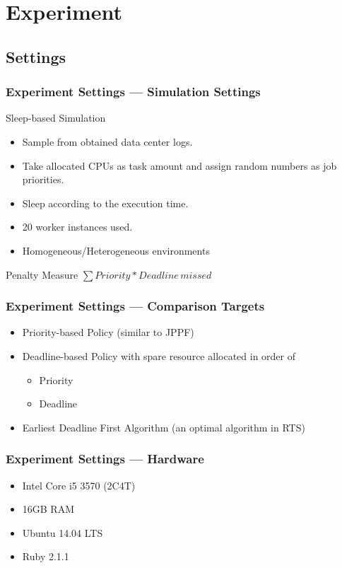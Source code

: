 \section{Experiment}
\subsection{Settings}
\begin{frame}
  \frametitle{Experiment Settings --- Simulation Settings}
  Sleep-based Simulation
  \begin{itemize}
    \item Sample from obtained data center logs.
    \item Take allocated CPUs as task amount and assign random numbers
      as job priorities.
    \item Sleep according to the execution time.
    \item 20 worker instances used.
    \item Homogeneous/Heterogeneous environments
  \end{itemize}
  \begin{exampleblock}{Penalty Measure}
    \centering
    $\sum Priority * Deadline\, missed$
  \end{exampleblock}
\end{frame}
\begin{frame}
  \frametitle{Experiment Settings --- Comparison Targets}
  \begin{itemize}
    \item Priority-based Policy (similar to JPPF)
    \item Deadline-based Policy with spare resource allocated in order
      of
      \begin{itemize}
        \item Priority
        \item Deadline
      \end{itemize}
    \item Earliest Deadline First Algorithm (an optimal algorithm in
      RTS)
  \end{itemize}
\end{frame}
\begin{frame}
  \frametitle{Experiment Settings --- Hardware}
  \begin{itemize}
    \item Intel Core i5 3570 (2C4T)
    \item 16GB RAM
    \item Ubuntu 14.04 LTS
    \item Ruby 2.1.1
  \end{itemize}
\end{frame}

